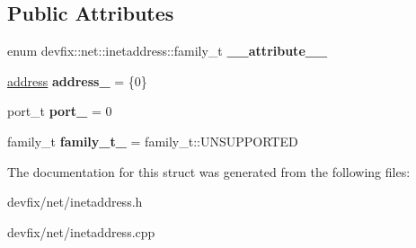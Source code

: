 \subsection*{Public Attributes}
\begin{DoxyCompactItemize}
\item 
\mbox{\label{structdevfix_1_1net_1_1inetaddress_a3752ca3c3b6522ec4e1777287627cbe3}} 
enum devfix\+::net\+::inetaddress\+::family_t {\bfseries \+\_\+\+\_\+attribute\+\_\+\+\_\+}
\item 
\mbox{\label{structdevfix_1_1net_1_1inetaddress_a902c9b8140f7c1fad452ef9de7f86561}} 
\hyperlink{uniondevfix_1_1net_1_1inetaddress_1_1address}{address} {\bfseries address\+\_\+} = \{0\}
\item 
\mbox{\label{structdevfix_1_1net_1_1inetaddress_a3b666575020939365ebcec1d7aeb0f34}} 
port\+\_\+t {\bfseries port\+\_\+} = 0
\item 
\mbox{\label{structdevfix_1_1net_1_1inetaddress_af025a2c8b37c28f5553f6f0c350d3765}} 
family_t {\bfseries family_t\+\_\+} = family_t\+::\+U\+N\+S\+U\+P\+P\+O\+R\+T\+ED
\end{DoxyCompactItemize}


The documentation for this struct was generated from the following files\+:\begin{DoxyCompactItemize}
\item 
devfix/net/inetaddress.\+h\item 
devfix/net/inetaddress.\+cpp\end{DoxyCompactItemize}
